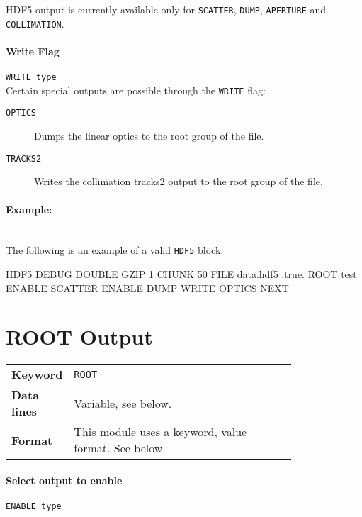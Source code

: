 HDF5 output is currently available only for \texttt{SCATTER}, \texttt{DUMP}, \texttt{APERTURE} and \texttt{COLLIMATION}.

\paragraph{Write Flag} \texttt{WRITE type}\\

Certain special outputs are possible through the \texttt{WRITE} flag:
\begin{description}
    \item[\texttt{OPTICS}] Dumps the linear optics to the root group of the file.
    \item[\texttt{TRACKS2}] Writes the collimation tracks2 output to the root group of the file.
\end{description}

\paragraph{Example:}~\\

The following is an example of a valid \texttt{HDF5} block:

\begin{cverbatim}
HDF5
    DEBUG
    DOUBLE
    GZIP 1
    CHUNK 50
    FILE data.hdf5 .true.
    ROOT test
    ENABLE SCATTER
    ENABLE DUMP
    WRITE OPTICS
NEXT
\end{cverbatim}

\section{ROOT Output} \label{ExtRoot}

\bigskip
\begin{tabular}{@{}lp{0.8\linewidth}}
    \textbf{Keyword}    & \texttt{ROOT}\index{ROOT} \\
    \textbf{Data lines} & Variable, see below. \\
    \textbf{Format}     & This module uses a keyword, value format. See below.
\end{tabular}

\paragraph{Select output to enable} \texttt{ENABLE type}\\

